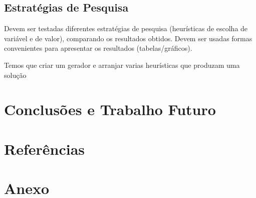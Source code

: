 \documentclass[11pt]{article}
\begin{document}
\subsection{Estratégias de Pesquisa} Devem ser testadas diferentes estratégias de pesquisa
(heurísticas de escolha de variável e de valor), comparando os resultados obtidos.
Devem ser usadas formas convenientes para apresentar os resultados (tabelas/gráficos).

Temos que criar um gerador e arranjar varias heurísticas que produzam uma solução

\section{Conclusões e Trabalho Futuro} 


\section{Referências} 



\section{Anexo} 
\end{document}
